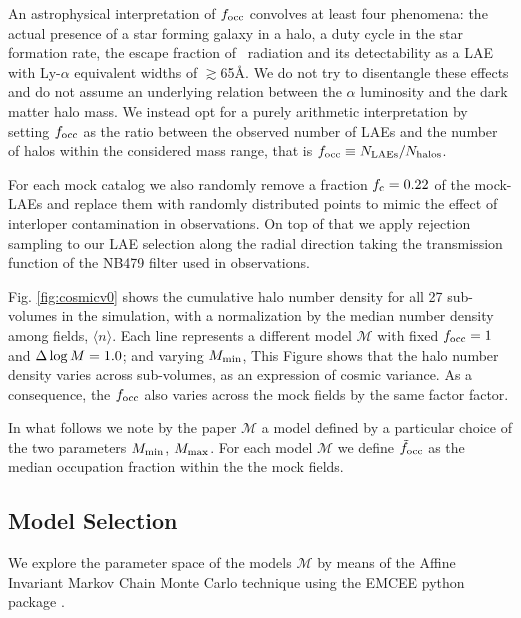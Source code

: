 \documentclass{emulateapj}
\newcommand{\ly}{{\ifmmode{{\rm Ly}\alpha}\else{Ly$\alpha$}\fi}}
\newcommand{\mmin}{{\ifmmode{{M_{\rm min}}}\else{${M_{\rm min}}$}\fi}}
\newcommand{\dlm}{{\ifmmode{{\Delta \log M}}\else{$\Delta \log M$}\fi}}
\newcommand{\focc}{{\ifmmode{{f_{\rm occ}}}\else{${f_{\rm occ}}$}\fi}}
\begin{document}
An astrophysical interpretation of $f_{\rm occ}$ convolves at least
four phenomena: the actual presence of a star forming galaxy in a
halo, a duty cycle in the star formation rate, the escape fraction of
\ly\ radiation and its detectability as a LAE with Ly-$\alpha$ equivalent widths of $\gtrsim$65\AA.   
We do not try to disentangle these effects and do not assume an underlying relation between the
$\alpha$ luminosity and the dark matter halo mass.
We instead opt for a purely arithmetic interpretation by setting
$\focc$ as the ratio between the observed number of LAEs and the
number of halos within the considered mass range, that is $\focc \equiv N_{\rm
  LAEs}/N_{\mathrm{halos}}$.   

For each mock catalog we also randomly remove a fraction $f_{\rm c}=0.22$  of the mock-LAEs and replace 
them with randomly distributed points to mimic the effect of interloper
contamination   in \citet{Bielby16} observations. 
On top of that we apply rejection sampling  to our LAE selection 
along the radial direction taking the transmission function of the
NB479 filter used in \citet{Bielby16} observations. 



Fig. \ref{fig:cosmicv0}  shows the cumulative halo number density
for all 27 sub-volumes in the simulation, with a normalization by the
median number density among fields, $\langle n \rangle$. 
Each line represents a different model $\mathcal{M}$ with fixed
$\focc=1$ and $\dlm=1.0$; and varying $\mmin$, 
This Figure shows that the halo number  density varies across
sub-volumes, as an expression of cosmic variance. 
As a consequence, the $\focc$ also varies across the mock fields  
by the same factor factor. 



In what follows we note by the paper ${\mathcal M}$ a model
defined by a particular choice of the two parameters $M_{\rm min}$, 
$M_{\rm  max}$. For each model  ${\mathcal M}$ we define
$\tilde{f}_{\rm occ}$ as the median occupation fraction within the the
mock fields.

\subsection{Model Selection}
\label{subsec:explore}



We  explore the parameter space of the models
${\mathcal M}$ by  means of the Affine Invariant  Markov Chain Monte Carlo technique using
the EMCEE python package \citep[][and references therein]{emcee2013}. 
\end{document}
